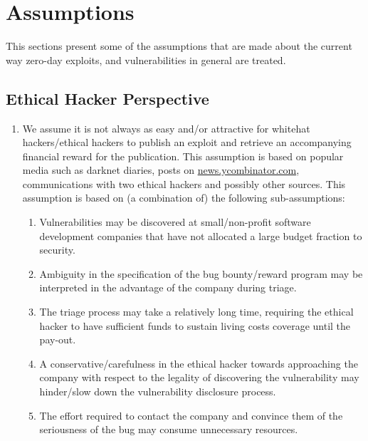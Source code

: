 \section{Assumptions}\label{sec:assumptions}
This sections present some of the assumptions that are made about the current way zero-day exploits, and vulnerabilities in general are treated.

\subsection{Ethical Hacker Perspective}
\begin{enumerate}
	\item We assume it is not always as easy and/or attractive for whitehat hackers/ethical hackers to publish an exploit and retrieve an accompanying financial reward for the publication. This assumption is based on popular media such as darknet diaries, posts on \url{news.ycombinator.com}, communications with two ethical hackers and possibly other sources. This assumption is based on (a combination of) the following sub-assumptions:
	\begin{enumerate}
		\item Vulnerabilities may be discovered at small/non-profit software development companies that have not allocated a large budget fraction to security.
		\item Ambiguity in the specification of the bug bounty/reward program may be interpreted in the advantage of the company during triage.
		\item The triage process may take a relatively long time, requiring the ethical hacker to have sufficient funds to sustain living costs coverage until the pay-out.
		\item A conservative/carefulness in the ethical hacker towards approaching the company with respect to the legality of discovering the vulnerability may hinder/slow down the vulnerability disclosure process.
		\item The effort required to contact the company and convince them of the seriousness of the bug may consume unnecessary resources.
	\end{enumerate}
\end{enumerate}

